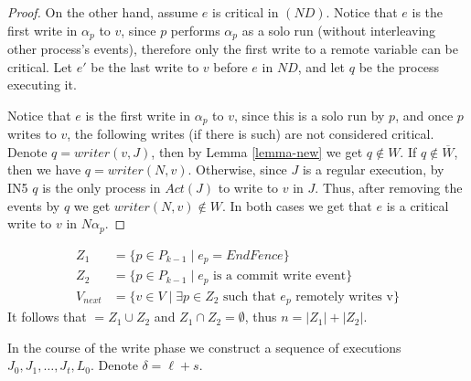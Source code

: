 \begin{proof}
	On the other hand, assume $e$ is critical in $(N D)$. Notice that $e$ is the first write in $\alpha_p$ to $v$, since $p$ performs $\alpha_p$ as a solo run (without interleaving other process's events), therefore only the first write to a remote variable can be critical. Let $e'$ be the last write to $v$ before $e$ in $N D$, and let $q$ be the process executing it. 
	
	Notice that $e$ is the first write in $\alpha_p$ to $v$, since this is a solo run by $p$, and once $p$ writes to $v$, the following writes (if there is such) are not considered critical. Denote $q = writer(v,J)$, then by Lemma \ref{lemma-new} we get $q \notin W$. If $q \notin \overline{W}$, then we have $q = writer(N,v)$. Otherwise, since $J$ is a regular execution, by IN5 $q$ is the only process in $Act(J)$ to write to $v$ in $J$. Thus, after removing the events by $q$ we get $writer(N,v) \notin W$. In both cases we get that $e$ is a critical write to $v$ in $N \alpha_p$. 
\end{proof}
















\newpage
\begin{align*}
Z_1 &= \{p \in P_{k-1} \mid e_p = EndFence\} \\
Z_2 &= \{p \in P_{k-1} \mid e_p \text{ is a commit write event}\} \\
V_{next} &= \{v \in V \mid \exists p \in Z_2 \text{ such that } e_p \text{ remotely writes v}\}
\end{align*}
It follows that $ = Z_1 \cup Z_2$ and $Z_1 \cap Z_2 = \emptyset$, thus $n = |Z_1|+|Z_2|$.



In the course of the write phase we construct a sequence of executions $J_0,J_1,\ldots,J_t, L_0$. Denote $\delta = \ell+s$.


